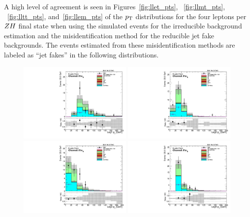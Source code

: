 A high level of agreement is seen in Figures~\ref{fig:llet_pts}, ~\ref{fig:llmt_pts},
~\ref{fig:lltt_pts}, and~\ref{fig:llem_pts}
of the $p_\mathrm{T}$ distributions for the four leptons per $ZH$
final state when using the simulated events for the irreducible background estimation and
the misidentification method for the reducible jet fake backgrounds.
The events estimated from these misidentification methods are labeled
as ``jet fakes'' in the following distributions.

\begin{figure}[htbp]
\centering
     \includegraphics[width=0.49\textwidth]{higgs_to_taus_vh/plots/zh/fr_OS_control/LLET/pt_1.pdf}
     \includegraphics[width=0.49\textwidth]{higgs_to_taus_vh/plots/zh/fr_OS_control/LLET/pt_2.pdf}
     \includegraphics[width=0.49\textwidth]{higgs_to_taus_vh/plots/zh/fr_OS_control/LLET/pt_3.pdf}
     \includegraphics[width=0.49\textwidth]{higgs_to_taus_vh/plots/zh/fr_OS_control/LLET/pt_4.pdf}

\end{figure}
